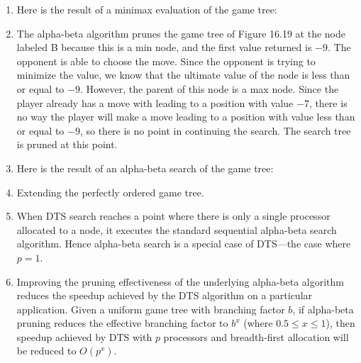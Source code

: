 \begin{enumerate}
\item Here is the result of a minimax evaluation of the game tree:
      \begin{center}
      \end{center}

\item The alpha-beta algorithm prunes the game tree of Figure 16.19 at
      the node labeled B because this is a min node, and the first
      value returned is $-9$. The opponent is able to choose the move.
      Since the opponent is trying to minimize the value, we know that
      the ultimate value of the node is less than or equal to $-9$.
      However, the parent of this node is a max node. Since the player
      already has a move with leading to a position with value $-7$,
      there is no way the player will make a move leading to a position
      with value less than or equal to $-9$, so there is no point in
      continuing the search. The search tree is pruned at this point.

\item Here is the result of an alpha-beta search of the game tree:
      \begin{center}
      \end{center}

\item Extending the perfectly ordered game tree.

      \begin{center}
      \end{center}

\item When DTS search reaches a point where there is only a single processor
      allocated to a node, it executes the standard sequential alpha-beta
      search algorithm.
      Hence alpha-beta search is a special case of DTS---the case where
      $p = 1$.

\item Improving the pruning effectiveness of the underlying alpha-beta
      algorithm reduces the speedup achieved by the DTS
      algorithm on a particular application.
      Given a uniform game tree with branching factor $b$, if
      alpha-beta pruning reduces the effective branching factor to $b^x$
      (where $0.5 \le x \le 1$), then speedup achieved by DTS
      with $p$ processors and
      breadth-first allocation will be reduced to $O(p^x)$.
\end{enumerate}

